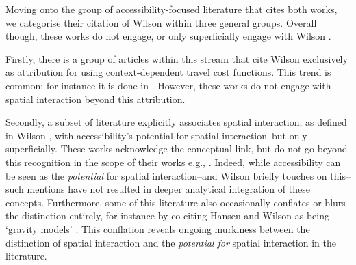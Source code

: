 \documentclass[
  10pt,
  letterpaper,
]{article}
\begin{document}
Moving onto the group of accessibility-focused literature that cites
both works, we categorise their citation of Wilson \citep{wilson1971}
within three general groups. Overall though, these works do not engage,
or only superficially engage with Wilson \citep{wilson1971}.

Firstly, there is a group of articles within this stream that cite
Wilson \citep{wilson1971} exclusively as attribution for using
context-dependent travel cost functions. This trend is common: for
instance it is done in
\citep{weibullNumericalMeasurementAccessibility1980, handyMeasuringAccessibilityExploration1997, kwan1998space, shenLocationCharacteristicsInnercity1998, ashiru2003space, rau2012spatial, pan2013impacts, margaridacondecomelhoradoImpactMeasuringInternal2016, caschili2015accessibility, grengs2015nonwork, pan2020measuring, chia2020extending, roblot2021participation, sharifiasl2023incorporating, kharel2024examining}.
However, these works do not engage with spatial interaction beyond this
attribution.

Secondly, a subset of literature explicitly associates spatial
interaction, as defined in Wilson \citep{wilson1971}, with
accessibility's potential for spatial interaction--but only
superficially. These works acknowledge the conceptual link, but do not
go beyond this recognition in the scope of their works e.g.,
\citep{millerMeasuringSpaceTimeAccessibility1999, giuliano2010accessibility, grengs2010intermetropolitan, grengs2010job, grengs2012equity, levine2012does, levinson2012positive, tong2015transportation, liu2015spatial, he2017measuring, wuUnifyingAccess2020, ng2022reflection, naqavi2023mobility, suel2024measuring}.
Indeed, while accessibility can be seen as the \emph{potential} for
spatial interaction--and Wilson \citep{wilson1971} briefly touches on
this--such mentions have not resulted in deeper analytical integration
of these concepts. Furthermore, some of this literature also
occasionally conflates or blurs the distinction entirely, for instance
by co-citing Hansen and Wilson as being `gravity models'
\citep[e.g.,][]{liu2004accessibility, dai2017visualization, shen2019segregation, chia2020extending}.
This conflation reveals ongoing murkiness between the distinction of
spatial interaction and the \emph{potential for} spatial interaction in
the literature.
\end{document}
